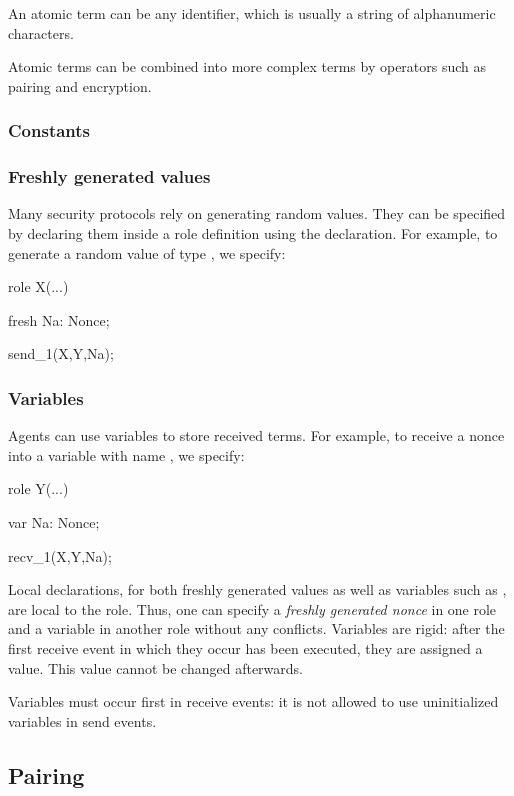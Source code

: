 \documentclass{book}
\begin{document}
An atomic term can be any identifier, which is usually a string of
alphanumeric characters.

Atomic terms can be combined into more complex terms by 
operators such as pairing and encryption.

\subsubsection{Constants}

\subsubsection{Freshly generated values}

Many security protocols rely on generating random values. They can be
specified by declaring them inside a role definition using the
 declaration. For example, to generate a random value
 of
type , we specify:
\begin{spdl}
  role X(...) {
    fresh Na: Nonce;

    send_1(X,Y,Na);
  }
\end{spdl}

\subsubsection{Variables}

Agents can use variables to store received terms. For example, to
receive a nonce into a variable with name , we specify:
\begin{spdl}
  role Y(...) {
    var Na: Nonce;
    
    recv_1(X,Y,Na);
  }
\end{spdl}
Local declarations, for both freshly generated values as
well as variables such as , are local to the role.
Thus, one can specify a \emph{freshly generated nonce}  in one
role and a variable  in another role without any conflicts.
Variables are rigid: after the first receive event in which they occur
has been executed, they are assigned a value. This value cannot be
changed afterwards.

Variables must occur first in receive events: it is not allowed to
use uninitialized variables in send events.

\subsection{Pairing}
\end{document}
